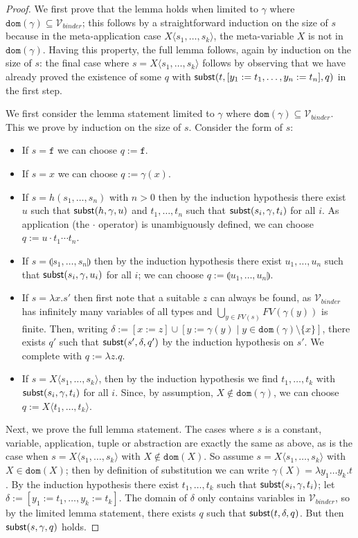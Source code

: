 \documentclass{lmcs}
\theoremstyle{theorem}\newtheorem{theorem}{Theorem}
\theoremstyle{theorem}\newtheorem{lemma}[theorem]{Lemma}
\theoremstyle{theorem}\newtheorem{corollary}[theorem]{Corollary}
\theoremstyle{definition}\newtheorem{definition}[theorem]{Definition}
\theoremstyle{definition}\newtheorem{example}[theorem]{Example}
\newcommand{\Vbound}{\mathcal{V}_{\mathit{binder}}}
\newcommand{\FV}{\mathit{FV}}
\newcommand{\domain}{\mathtt{dom}}
\newcommand{\identifier}[1]{\mathtt{#1}}
\newcommand{\afun}{\identifier{f}}
\newcommand{\avar}{x}
\newcommand{\bvar}{y}
\newcommand{\cvar}{z}
\newcommand{\Avar}{X}
\newcommand{\abs}[2]{\lambda #1.#2}
\newcommand{\meta}[2]{#1\langle#2\rangle}
\newcommand{\tuple}[2]{\llparenthesis #1,\dots,#2 \rrparenthesis}
\begin{document}
\begin{proof}
We first prove that the lemma holds when limited to $\gamma$ where
$\domain(\gamma) \subseteq \Vbound$; this follows by a straightforward induction
on the size of $s$ because in the meta-application case $\meta{\Avar}{s_1,\dots,
s_k}$, the meta-variable $\Avar$ is not in $\domain(\gamma)$.
Having this property, the full lemma follows, again by induction on the size of
$s$: the final case where $s = \meta{\Avar}{s_1,\dots,s_k}$ follows by
observing that we have already proved the existence of some $q$ with
$\subrel{t,[\bvar_1:=t_1,\dots,\bvar_n:=t_n],q}$ in the first step.

We first consider the lemma statement limited to $\gamma$ where
$\domain(\gamma) \subseteq \Vbound$.  This we prove by induction on the size of
$s$.  Consider the form of $s$:
\begin{itemize}
\item If $s = \afun$ we can choose $q := \afun$.
\item If $s = \avar$ we can choose $q := \gamma(\avar)$.
\item If $s = h(s_1,\dots,s_n)$ with $n > 0$ then by the induction hypothesis
  there exist $u$ such that $\mathsf{subst}(h,\gamma,u)$ and $t_1,\dots,t_n$ such that
  $\mathsf{subst}(s_i,\gamma,t_i)$ for all $i$.  As application (the $\cdot$ operator)
  is unambiguously defined, we can choose $q := u \cdot t_1 \cdots t_n$.
\item If $s = \tuple{s_1}{s_n}$ then by the induction hypothesis there exist
  $u_1,\dots,u_n$ such that $\mathsf{subst}(s_i,\gamma,u_i)$ for all $i$; we can
  choose $q := \tuple{u_1}{u_n}$.
\item If $s = \abs{\avar}{s'}$ then first note that a suitable $\cvar$ can
  always be found, as $\Vbound$ has infinitely many variables of all types and
  $\bigcup_{\bvar \in \FV(s)} \FV(\gamma(\bvar))$ is finite.  Then, writing
  $\delta := [\avar:=\cvar] \cup [\bvar:=\gamma(\bvar) \mid \bvar \in
  \domain(\gamma) \setminus \{\avar\}]$, there exists $q'$ such that
  $\mathsf{subst}(s',\delta,q')$ by the induction hypothesis on $s'$.  We complete with
  $q := \abs{\cvar}{q}$.
\item If $s = \meta{\Avar}{s_1,\dots,s_k}$, then by the induction hypothesis we
  find $t_1,\dots,t_k$ with $\mathsf{subst}(s_i,\gamma,t_i)$ for all $i$.  Since, by
  assumption, $\Avar \notin \domain(\gamma)$, we can choose $q :=
  \meta{\Avar}{t_1,\dots,t_k}$.
\end{itemize}
Next, we prove the full lemma statement. The cases where $s$ is a constant,
variable, application, tuple or abstraction are exactly the same as above, as is
the case when $s = \meta{\Avar}{s_1,\dots,s_k}$ with $\Avar \notin \domain(
\Avar)$.  So assume $s = \meta{\Avar}{s_1,\dots,s_k}$ with $\Avar \in
\domain(\Avar)$; then by definition of substitution we can write
$\gamma(\Avar) = \abs{\bvar_1 \dots \bvar_k}{t}$.  By the induction hypothesis
there exist $t_1,\dots,t_k$ such that $\mathsf{subst}(s_i,\gamma,t_i)$; let $\delta :=
[\bvar_1:=t_1,\dots,\bvar_k:=t_k]$.  The domain of $\delta$ only contains
variables in $\Vbound$, so by the limited lemma statement, there exists $q$
such that $\mathsf{subst}(t,\delta,q)$.  But then $\mathsf{subst}(s,\gamma,q)$ holds.
\end{proof}
\end{document}
